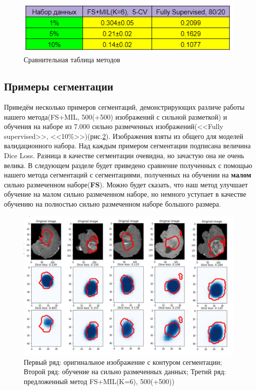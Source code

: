 \begin{figure}[h!] 
  \center
  \includegraphics [scale=1.0] {images/compare_with_fs.png}
  \caption{Сравнительная таблица методов}
  \label{fig:cmp_with_fs}  
\end{figure}
\newpage
\subsection{Примеры сегментации}

Приведём несколько примеров сегментаций, демонстрирующих различе работы нашего метода(FS+MIL, 500(+500) изображений с сильной разметкой) и обучения на наборе из 7.000 сильно размеченных изображений(<<Fully supervised>>, <<10\%>>)(рис.\ref{fig:cmp_fs_ours}).   Изображения взяты из общего для моделей валидационного набора. Над каждым примером сегментации подписана величина Dice Loss. Разница в качестве сегментации очевидна, но зачастую она не очень велика. В следующем разделе будет приведено сравнение полученных с помощью нашего метода сегментаций с сегментациями, полученных на обучении на {\bf малом} сильно размеченном наборе({\bf FS}). Можно будет сказать, что наш метод улучшает обучение на малом сильно размеченном наборе, но немного уступает в качестве обучению на полностью сильно размеченном наборе большого размера. 

\begin{figure}[h!] 
  \center
  \includegraphics [scale=0.8] {images/cmp_fs_ours.png}
  \caption{Первый ряд: оригинальное изображение с контуром сегментации; Второй ряд: обучение на сильно размеченных данных; Третий ряд: предложенный метод FS+MIL(K=6), 500(+500))}
  \label{fig:cmp_fs_ours}  
\end{figure}




